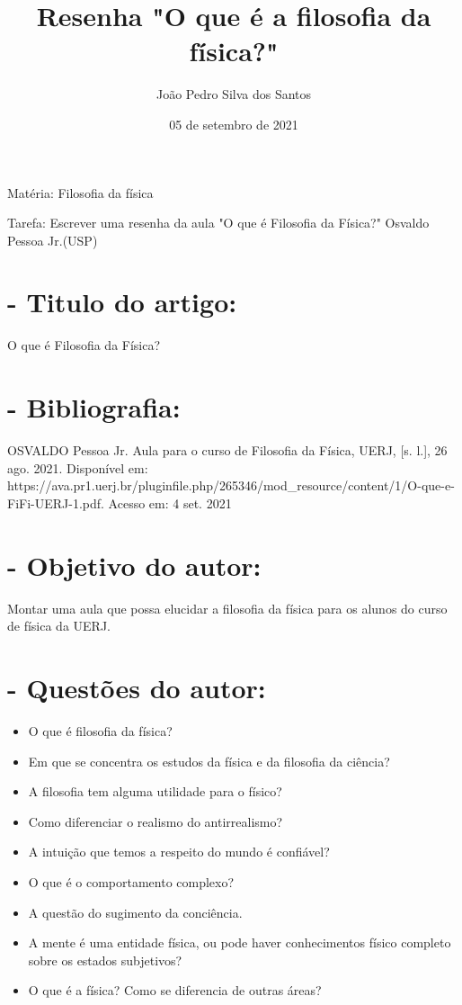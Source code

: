 \documentclass [a4paper, 12pt]{article}
\title{Resenha "O que é a filosofia da física?"}
\author{João Pedro Silva dos Santos}
\date{05 de setembro de 2021}
\begin{document}
\maketitle

Matéria: Filosofia da física

Tarefa: Escrever uma resenha da aula "O que é Filosofia da Física?"  Osvaldo Pessoa Jr.(USP)

\section*{-  Titulo do artigo:}

O que é Filosofia da Física?

\section*{-  Bibliografia:}

OSVALDO Pessoa Jr. Aula para o curso de Filosofia da Física, UERJ, [s. l.], 26 ago. 2021. Disponível em: https://ava.pr1.uerj.br/pluginfile.php/265346/mod_resource/content/1/O-que-e-FiFi-UERJ-1.pdf. Acesso em: 4 set. 2021

\section*{- Objetivo do autor:}

Montar uma aula que possa elucidar a filosofia da física para os alunos do curso de física da UERJ.

\section*{- Questões do autor:}

\begin{itemize}
    \item O que é filosofia da física?
    \item Em que se concentra os estudos da física e da filosofia da ciência?
    \item A filosofia tem alguma utilidade para o físico?
    \item Como diferenciar o realismo do antirrealismo?
    \item A intuição que temos a respeito do mundo é confiável?
    \item O que é o comportamento complexo?
    \item A questão do sugimento da conciência.
    \item A mente é uma entidade física, ou pode haver conhecimentos físico completo sobre os estados subjetivos?
    \item O que é a física? Como se diferencia de outras áreas?
\end{itemize}
\end{document}
